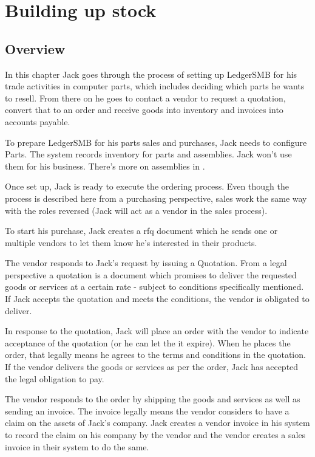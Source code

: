 \chapter{Building up stock}
\label{cha-building-up-stock}

\section{Overview}
\label{sec-stock-overview}

In this chapter Jack goes through the process of setting up LedgerSMB for his
trade activities in computer parts, which includes deciding which parts he wants to
resell. From there on he goes to contact a vendor to request a quotation, convert that
to an order and receive goods into inventory and invoices into accounts payable.

To prepare LedgerSMB for his parts sales and purchases, Jack needs to configure Parts.
The system records inventory for parts and assemblies. Jack won't use them for his
business. There's more on assemblies in .

Once set up, Jack is ready to execute the ordering process. Even though the process
is described here from a purchasing perspective, sales work the same way with the roles
reversed (Jack will act as a vendor in the sales process).

To start his purchase, Jack creates a \gls{rfq} document which
he sends one or multiple vendors to let them know he's interested in their products.

The vendor responds to Jack's request by issuing a Quotation. From a legal perspective
a quotation is a document which promises to deliver the requested goods or services at a
certain rate - subject to conditions specifically mentioned. If Jack accepts the quotation
and meets the conditions, the vendor is obligated to deliver.

In response to the quotation, Jack will place an order with the vendor to indicate
acceptance of the quotation (or he can let the
it expire). When he places the order, that legally means he agrees to the terms
and conditions in the quotation. If the vendor delivers the goods or services as per the
order, Jack has accepted the legal obligation to pay.

The vendor responds to the order by shipping the goods and services as well
as sending an invoice. The invoice legally means the vendor considers to have a claim on the assets
of Jack's company. Jack creates a vendor invoice in his system to record the claim on his
company by the vendor and the vendor creates a sales invoice in their system to do the same.

